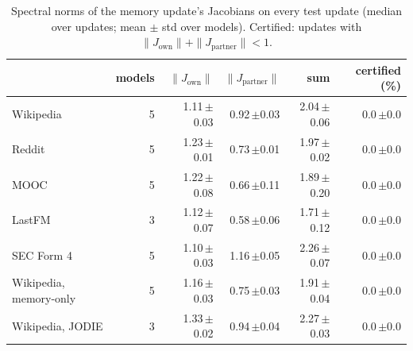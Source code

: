 \begin{table}[!htb]
\centering\scriptsize
\caption{Spectral norms of the memory update's Jacobians on every test update (median over updates; mean $\pm$ std over
models). Certified: updates with $\|J_{\text{own}}\|+\|J_{\text{partner}}\|<1$.}
\label{tab:jac}
\setlength{\tabcolsep}{4pt}
\begin{tabular}{@{}lrrrrr@{}}
\toprule
 & models & $\|J_{\text{own}}\|$ & $\|J_{\text{partner}}\|$ & sum & certified (\%) \\
\midrule
Wikipedia & 5 & 1.11\,{\scriptsize$\pm$0.03} & 0.92\,{\scriptsize$\pm$0.03} & 2.04\,{\scriptsize$\pm$0.06} & 0.0\,{\scriptsize$\pm$0.0} \\
Reddit & 5 & 1.23\,{\scriptsize$\pm$0.01} & 0.73\,{\scriptsize$\pm$0.01} & 1.97\,{\scriptsize$\pm$0.02} & 0.0\,{\scriptsize$\pm$0.0} \\
MOOC & 5 & 1.22\,{\scriptsize$\pm$0.08} & 0.66\,{\scriptsize$\pm$0.11} & 1.89\,{\scriptsize$\pm$0.20} & 0.0\,{\scriptsize$\pm$0.0} \\
LastFM & 3 & 1.12\,{\scriptsize$\pm$0.07} & 0.58\,{\scriptsize$\pm$0.06} & 1.71\,{\scriptsize$\pm$0.12} & 0.0\,{\scriptsize$\pm$0.0} \\
SEC Form 4 & 5 & 1.10\,{\scriptsize$\pm$0.03} & 1.16\,{\scriptsize$\pm$0.05} & 2.26\,{\scriptsize$\pm$0.07} & 0.0\,{\scriptsize$\pm$0.0} \\
Wikipedia, memory-only & 5 & 1.16\,{\scriptsize$\pm$0.03} & 0.75\,{\scriptsize$\pm$0.03} & 1.91\,{\scriptsize$\pm$0.04} & 0.0\,{\scriptsize$\pm$0.0} \\
Wikipedia, JODIE & 3 & 1.33\,{\scriptsize$\pm$0.02} & 0.94\,{\scriptsize$\pm$0.04} & 2.27\,{\scriptsize$\pm$0.03} & 0.0\,{\scriptsize$\pm$0.0} \\
\bottomrule
\end{tabular}
\end{table}
